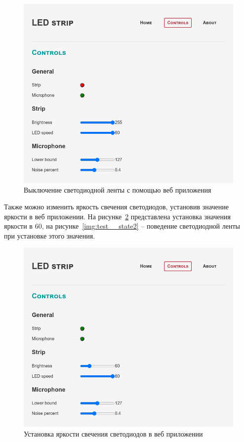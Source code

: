 \begin{figure}[H]
  \centering
  \includegraphics[height=0.3\textheight]{assets/images/practical/test__controls-strip-off.png}
  \caption{Выключение светодиодной ленты с помощью веб приложения}
  \label{img:test__controls-strip-off}
\end{figure}

Также можно изменить яркость свечения светодиодов, установив значение яркости в веб приложении. На рисунке~\ref{img:test__controls-brightness-60} представлена установка значения яркости в 60, на рисунке~\ref{img:test__state2} -- поведение светодиодной ленты при установке этого значения.

\begin{figure}[H]
  \centering
  \includegraphics[height=0.3\textheight]{assets/images/practical/test__controls-brightness-60.png}
  \caption{Установка яркости свечения светодиодов в веб приложении}
  \label{img:test__controls-brightness-60}
\end{figure}

